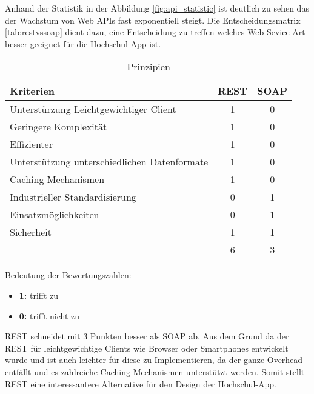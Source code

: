 Anhand der Statistik in der Abbildung \ref{fig:api_statistic} ist deutlich zu sehen das der Wachstum von Web APIs fast exponentiell steigt. Die Entscheidungsmatrix \ref{tab:restvssoap} dient dazu, eine Entscheidung zu treffen welches Web Sevice Art besser geeignet für die Hochschul-App ist.

\begin{table}[H]
\begin{center}
  \begin{tabular}{| l | c | c |}
    \hline
    Kriterien & REST & SOAP \\ \hline
    Unterstürzung Leichtgewichtiger Client 		& 1 			& 0 \\ 
    \hline
    Geringere Komplexität 						& 1 			& 0 \\
    \hline
    Effizienter			 						& 1 			& 0 \\
    \hline
    Unterstützung unterschiedlichen Datenformate	& 1 			& 0 \\
    \hline
    Caching-Mechanismen	 						& 1 			& 0 \\
    \hline
    Industrieller Standardisierung				& 0 			& 1 \\
    \hline
    Einsatzmöglichkeiten 						& 0 			& 1 \\
    \hline
    Sicherheit			 						& 1 			& 1 \\
    \hline
    												& 6			& 3 \\
    	\hline
  \end{tabular}
  \end{center}
\caption[Tabelle]{Prinzipien}
\label{tab:prinzipien}
\end{table}



Bedeutung der Bewertungszahlen: 
\begin{itemize}
\item \textbf{1:} trifft zu
\item \textbf{0:} trifft nicht zu
\end{itemize} 

REST schneidet mit 3 Punkten besser als SOAP ab. Aus dem Grund da der REST für leichtgewichtige Clients wie Browser oder Smartphones entwickelt wurde und ist auch leichter für diese zu Implementieren, da der ganze Overhead entfällt und es zahlreiche Caching-Mechanismen unterstützt werden. Somit stellt REST eine interessantere Alternative für den Design der Hochschul-App.